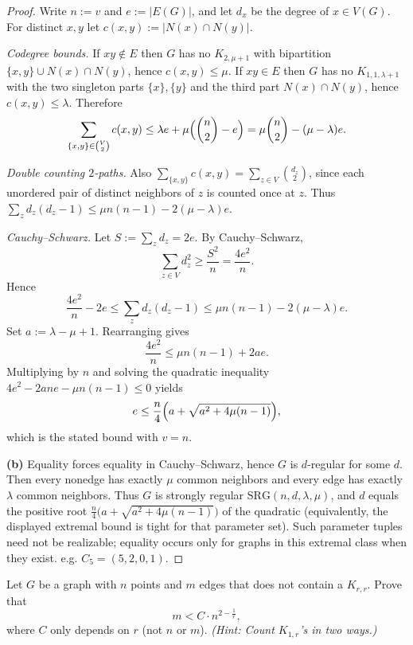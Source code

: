\documentclass[11pt, a4paper]{ctexrep}
\begin{document}
\begin{proof}
    Write $n:=v$ and $e:=|E(G)|$, and let $d_x$ be the degree of $x\in V(G)$.
    For distinct $x,y$ let $c(x,y):=|N(x)\cap N(y)|$.

    \smallskip
    \noindent\emph{Codegree bounds.}
    If $xy\notin E$ then $G$ has no $K_{2,\mu+1}$ with bipartition $\{x,y\}\cup N(x)\cap N(y)$, hence $c(x,y)\le \mu$.
    If $xy\in E$ then $G$ has no $K_{1,1,\lambda+1}$ with the two singleton parts $\{x\},\{y\}$ and the third part $N(x)\cap N(y)$, hence $c(x,y)\le \lambda$.
    Therefore
    \begin{equation}\label{eq:week3-codegree-sum}
        \sum_{\{x,y\}\in \binom{V}{2}} c(x,y)
        \le \lambda e+\mu\Bigl(\binom{n}{2}-e\Bigr)
        =\mu\binom{n}{2}-(\mu-\lambda)e.
    \end{equation}

    \smallskip
    \noindent\emph{Double counting $2$-paths.}
    Also $\sum_{\{x,y\}} c(x,y)=\sum_{z\in V}\binom{d_z}{2}$, since each unordered pair of distinct neighbors of $z$ is counted once at $z$.
    Thus $\sum_z d_z(d_z-1)\le \mu n(n-1)-2(\mu-\lambda)e$.

    \smallskip
    \noindent\emph{Cauchy--Schwarz.}
    Let $S:=\sum_z d_z=2e$. By Cauchy--Schwarz,
    \[
        \sum_{z\in V} d_z^2 \ge \frac{S^2}{n}=\frac{4e^2}{n}.
    \]
    Hence
    \[
        \frac{4e^2}{n}-2e \le \sum_z d_z(d_z-1)\le \mu n(n-1)-2(\mu-\lambda)e.
    \]
    Set $a:=\lambda-\mu+1$. Rearranging gives
    \[
        \frac{4e^2}{n}\le \mu n(n-1)+2ae.
    \]
    Multiplying by $n$ and solving the quadratic inequality
    $4e^2-2a n e-\mu n(n-1)\le 0$
    yields
    \[
        e\le \frac{n}{4}\Bigl(a+\sqrt{a^2+4\mu(n-1)}\Bigr),
    \]
    which is the stated bound with $v=n$.

    \smallskip
    \noindent\textbf{(b)}
    Equality forces equality in Cauchy--Schwarz, hence $G$ is $d$-regular for some $d$.
    Then every nonedge has exactly $\mu$ common neighbors and every edge has exactly $\lambda$ common neighbors.
    Thus $G$ is strongly regular $\mathrm{SRG}(n,d,\lambda,\mu)$, and $d$ equals the positive root
    $\tfrac{n}{4}\bigl(a+\sqrt{a^2+4\mu(n-1)}\bigr)$ of the quadratic (equivalently, the displayed extremal bound is tight for that parameter set).
    Such parameter tuples need not be realizable; equality occurs only for graphs in this extremal class when they exist. e.g. $C_5=(5,2,0,1)$.
\end{proof}

\begin{exercise}
    Let $G$ be a graph with $n$ points and $m$ edges that does not contain a $K_{r,r}$.
    Prove that
    \[
        m < C \cdot n^{2-\frac{1}{r}},
    \]
    where $C$ only depends on $r$ (not $n$ or $m$).
    \emph{(Hint: Count $K_{1,r}$'s in two ways.)}
\end{exercise}
\end{document}
